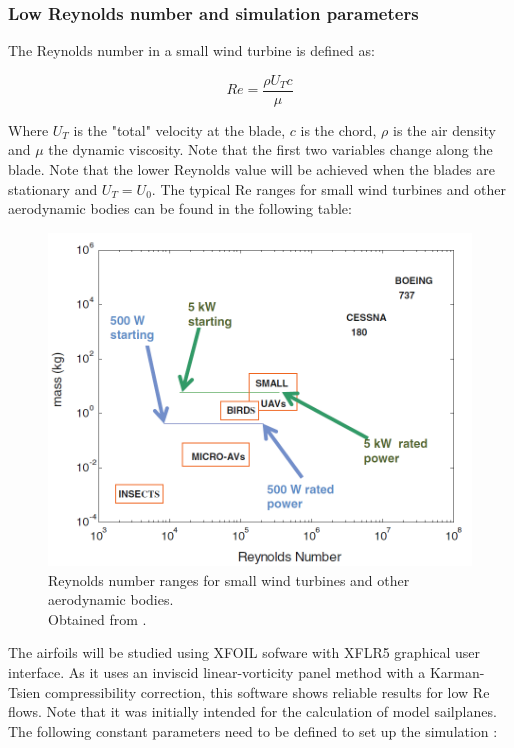 \documentclass[../TFG_Report.tex]{subfiles}
\begin{document}
\subsubsection{Low Reynolds number and simulation parameters }

The Reynolds number in a small wind turbine is defined as:

\begin{equation}
Re = \frac{\rho U_T c }{\mu}
\end{equation}

Where $U_T$ is the "total" velocity at the blade, $c$ is the chord, $\rho$ is the air density and $\mu$ the dynamic viscosity. Note that the first two variables change along the blade. Note that the lower Reynolds value will be achieved when the blades are stationary and $U_T = U_0$. The typical Re ranges for small wind turbines and other aerodynamic bodies can be found in the following table: 

\begin{figure}[h!]
	\centering
	\includegraphics[width=0.6\linewidth]{Images/Low_RE_Number}
	\caption[Reynolds number ranges]{Reynolds number ranges for small wind turbines and other aerodynamic bodies. \\
		Obtained from \cite{Wood}.}
	\label{fig:LowReNumber}
\end{figure}

\FloatBarrier

The airfoils will be studied using XFOIL sofware with XFLR5 graphical user interface. As it uses an inviscid linear-vorticity panel method with a Karman-Tsien compressibility correction, this software shows reliable results for low Re flows. Note that it was initially intended for the calculation of model sailplanes. The following constant parameters need to be defined to set up the simulation \cite{fuentes2016airfoil}: 
\end{document}
